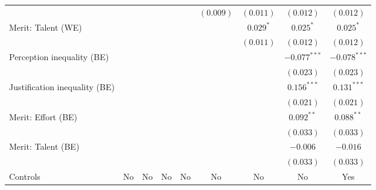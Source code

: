 \documentclass[
  12pt,
]{article}
\begin{document}
\begin{table}
{\begin{center}
{\begin{threeparttable}
\begin{tabular}{l c c c c c c c c}
                                     &                &                &                &                & $(0.009)$      & $(0.011)$      & $(0.012)$      & $(0.012)$      \\
Merit: Talent (WE)                   &                &                &                &                &                & $0.029^{*}$    & $0.025^{*}$    & $0.025^{*}$    \\
                                     &                &                &                &                &                & $(0.011)$      & $(0.012)$      & $(0.012)$      \\
Perception inequality (BE)           &                &                &                &                &                &                & $-0.077^{***}$ & $-0.078^{***}$ \\
                                     &                &                &                &                &                &                & $(0.023)$      & $(0.023)$      \\
Justification inequality (BE)        &                &                &                &                &                &                & $0.156^{***}$  & $0.131^{***}$  \\
                                     &                &                &                &                &                &                & $(0.021)$      & $(0.021)$      \\
Merit: Effort (BE)                   &                &                &                &                &                &                & $0.092^{**}$   & $0.088^{**}$   \\
                                     &                &                &                &                &                &                & $(0.033)$      & $(0.033)$      \\
Merit: Talent (BE)                   &                &                &                &                &                &                & $-0.006$       & $-0.016$       \\
                                     &                &                &                &                &                &                & $(0.033)$      & $(0.033)$      \\
\midrule
Controls                             & No             & No             & No             & No             & No             & No             & No             & Yes            \\

\end{tabular}
\end{threeparttable}}
\end{center}}
\end{table}
\end{document}
